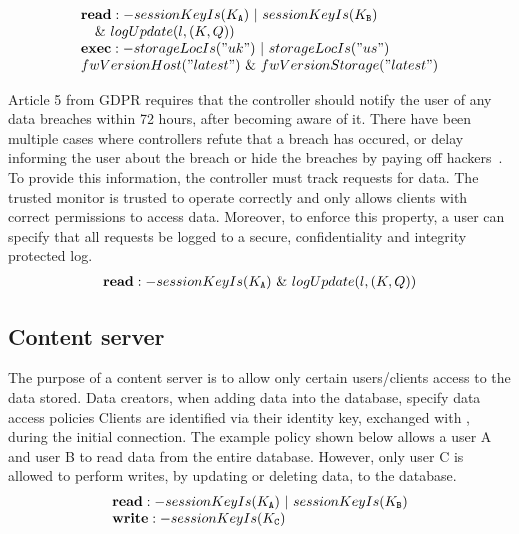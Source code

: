\vspace{-2mm}
\[
 \begin{array}{@{}l@{}}
 \textbf{read}:-sessionKeyIs(K_{\tt A})~|~sessionKeyIs(K_{\tt B}) \\
 ~~~\&~logUpdate(l, (K, Q))\\
 \textbf{exec}:-storageLocIs ("uk") ~ | ~ storageLocIs ("us")\\
 fwVersionHost ("latest") ~ \& ~ fwVersionStorage ("latest")\\
 \end{array}
\]
\vspace{-2mm}

Article 5 from GDPR requires that the controller should notify the user of any data breaches within 72 hours, after becoming aware of it. There have been multiple cases where controllers refute that a breach has occured, or delay informing the user about the breach or hide the breaches by paying off hackers~\cite{breach-refute, breach-delay, breach-payoff}. To provide this information, the controller must track requests for data. The trusted monitor is trusted to operate correctly and only allows clients with correct permissions to access data. Moreover, to enforce this property, a user can specify that all requests be logged to a secure, confidentiality and integrity protected log.
\vspace{-2mm}
\[
 \begin{array}{@{}l@{}}
 \textbf{read}:-sessionKeyIs(K_{\tt A})~\&~logUpdate(l, (K, Q))
 \end{array}
\]
\vspace{-4mm}

\subsection{Content server}

The purpose of a content server is to allow only certain users/clients access to the data stored. Data creators, when adding data into the database, specify data access policies Clients are identified via their identity key, exchanged with \project{}, during the initial connection. The example policy shown below allows a user A and user B to read data from the entire database. However, only user C is allowed to perform writes, by updating or deleting data, to the database.
\[
 \begin{array}{@{}l@{}}
 \textbf{read}:-sessionKeyIs (K_{\tt A}) ~ | ~ sessionKeyIs (K_{\tt B})\\
 \textbf{write}:-sessionKeyIs (K_{\tt C})\\
 \end{array}
\]

